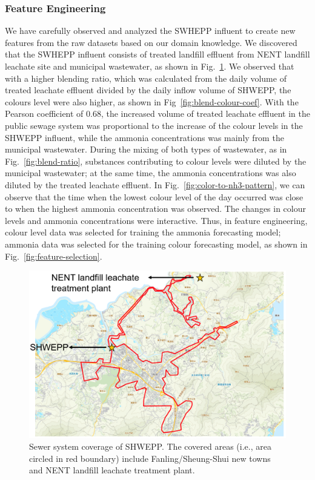 \subsubsection{Feature Engineering}
We have carefully observed and analyzed the SWHEPP influent to create new features from the raw datasets based on our domain knowledge. We discovered that the SWHEPP influent consists of treated landfill effluent from NENT landfill leachate site and municipal wastewater, as shown in Fig.~\ref{fig:geomap}. We observed that with a higher blending ratio, which was calculated from the daily volume of treated leachate effluent divided by the daily inflow volume of SHWEPP, the colours level were also higher, as shown in Fig~\ref{fig:blend-colour-coef}. With the Pearson coefficient of 0.68, the increased volume of treated leachate effluent in the public sewage system was proportional to the increase of the colour levels in the SHWEPP influent, while the ammonia concentrations was mainly from the municipal wastewater. During the mixing of both types of wastewater, as in Fig.~\ref{fig:blend-ratio}, substances contributing to colour levels were diluted by the municipal wastewater; at the same time, the ammonia concentrations was also diluted by the treated leachate effluent. In Fig.~\ref{fig:color-to-nh3-pattern}, we can observe that the time when the lowest colour level of the day occurred was close to when the highest ammonia concentration was observed. The changes in colour levels and ammonia concentrations were interactive. Thus, in feature engineering, colour level data was selected for training the ammonia forecasting model; ammonia data was selected for the training colour forecasting model, as shown in Fig.~\ref{fig:feature-selection}.
 
\begin{figure}[!ht]
    \centering
    \includegraphics[width=0.95\columnwidth]{imgs/pre-processing/geomap.png}
    \caption{Sewer system coverage of SHWEPP. The covered areas (i.e., area circled in red boundary) include Fanling/Sheung-Shui new towns and NENT landfill leachate treatment plant.}
    \label{fig:geomap}
 \end{figure}

